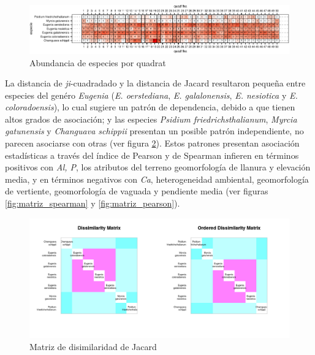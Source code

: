 \documentclass[11pt,]{article}
\begin{document}
\begin{figure}
\centering
\includegraphics{manuscrito_files/figure-latex/unnamed-chunk-3-1.pdf}
\caption{\label{fig:abun_sp_q}Abundancia de especies por quadrat}
\end{figure}

La distancia de \emph{ji}-cuadradado y la distancia de Jacard resultaron
pequeña entre especies del genéro \emph{Eugenia} (\emph{E. oerstediana},
\emph{E. galalonensis}, \emph{E. nesiotica} y \emph{E. coloradoensis}),
lo cual sugiere un patrón de dependencia, debido a que tienen altos
grados de asociación; y las especies \emph{Psidium friedrichsthalianum},
\emph{Myrcia gatunensis} y \emph{Changuava schippii} presentan un
posible patrón independiente, no parecen asociarse con otras (ver figura
\ref{fig:matriz_Jacard}). Estos patrones presentan asociación
estadísticas a través del índice de Pearson y de Spearman infieren en
términos positivos con \emph{Al, P}, los atributos del terreno
geomorfología de llanura y elevación media, y en términos negativos con
\emph{Ca}, heterogeneidad ambiental, geomorfología de vertiente,
geomorfología de vaguada y pendiente media (ver figuras
\ref{fig:matriz_spearman} y \ref{fig:matriz_pearson}).

\begin{figure}
\centering
\includegraphics{Disimilaridad_.png}
\caption{Matriz de disimilaridad de Jacard \label{fig:matriz_Jacard}}
\end{figure}
\end{document}
